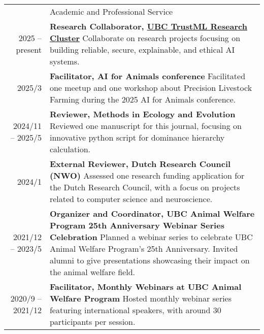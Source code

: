 \documentclass[letterpaper, 11pt]{article}
\newcommand{\headingfont}{\Large\color{OliveGreen}}
\newenvironment{SectionTable}[1]{
	\renewcommand*{\arraystretch}{1.7}
	\setlength{\tabcolsep}{10pt}
	\begin{longtable}{Rp{5.2in}} & #1 \\}
{\end{longtable}\vspace{-.3cm}}
\begin{document}
\begin{SectionTable}{\headingfont Academic and Professional Service}
2025 -- present &
\textbf{Research Collaborator, \href{https://trustml.ubc.ca/profiles/sky-sheng}{UBC TrustML Research Cluster}} \newline
Collaborate on research projects focusing on building reliable, secure, explainable, and ethical AI systems. \\
2025/3 &
\textbf{Facilitator, AI for Animals conference} \newline
Facilitated one meetup and one workshop about Precision Livestock Farming during the 2025 AI for Animals conference. \\
2024/11 -- 2025/5 &
\textbf{Reviewer, Methods in Ecology and Evolution} \newline
Reviewed one manuscript for this journal, focusing on innovative python script for dominance hierarchy calculation. \\
2024/1 &
\textbf{External Reviewer, Dutch Research Council (NWO)} \newline
Assessed one research funding application for the Dutch Research Council, with a focus on projects related to computer science and neuroscience. \\
2021/12 -- 2023/5 &
\textbf{Organizer and Coordinator, UBC Animal Welfare Program 25th Anniversary Webinar Series Celebration} \newline
Planned a webinar series to celebrate UBC Animal Welfare Program's 25th Anniversary. Invited alumni to give presentations showcasing their impact on the animal welfare field. \\
2020/9 -- 2021/12 &
\textbf{Facilitator, Monthly Webinars at UBC Animal Welfare Program} \newline
Hosted monthly webinar series featuring international speakers, with around 30 participants per session. \\
\end{SectionTable}
\end{document}
